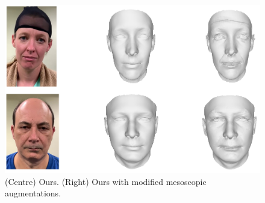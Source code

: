 \documentclass[10pt,twocolumn,letterpaper]{article}
\begin{document}
 \begin{figure}
\begin{center}
  \includegraphics[width=0.6\linewidth]{images/meso_new.png}
\end{center}
  \caption{(Centre) Ours. (Right) Ours with modified mesoscopic augmentations.}
\label{fig:high_freq}
\end{figure}


\end{document}
